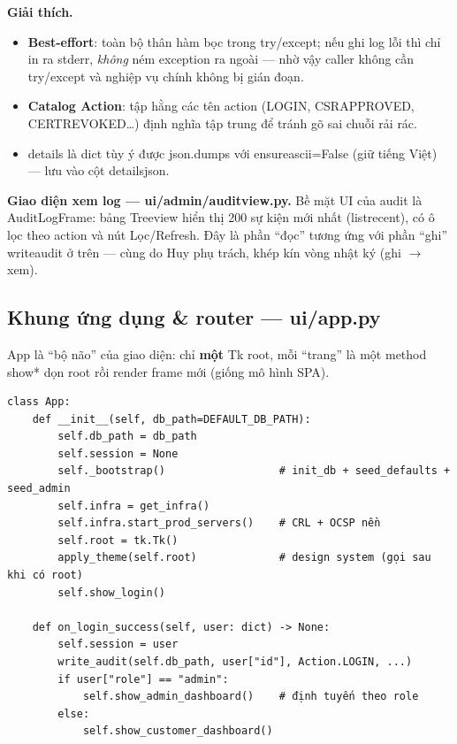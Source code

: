 \documentclass[12pt,a4paper]{article}
\newcommand{\code}[1]{{\ttfamily\small\def\_{\textunderscore\discretionary{}{}{}}#1}}
\begin{document}
\textbf{Giải thích.}
\begin{itemize}
  \item \textbf{Best-effort}: toàn bộ thân hàm bọc trong \code{try/except}; nếu
        ghi log lỗi thì chỉ in ra stderr, \emph{không} ném exception ra ngoài —
        nhờ vậy caller không cần \code{try/except} và nghiệp vụ chính không bị
        gián đoạn.
  \item \textbf{Catalog \code{Action}}: tập hằng các tên action
        (\code{LOGIN}, \code{CSR\_APPROVED}, \code{CERT\_REVOKED}\dots) định nghĩa
        tập trung để tránh gõ sai chuỗi rải rác.
  \item \code{details} là dict tùy ý được \code{json.dumps} với
        \code{ensure\_ascii=False} (giữ tiếng Việt) — lưu vào cột
        \code{details\_json}.
\end{itemize}

\textbf{Giao diện xem log --- \code{ui/admin/audit\_view.py}.} Bề mặt UI của audit
là \code{AuditLogFrame}: bảng Treeview hiển thị 200 sự kiện mới nhất
(\code{list\_recent}), có ô lọc theo \code{action} và nút Lọc/Refresh. Đây là
phần ``đọc'' tương ứng với phần ``ghi'' \code{write\_audit} ở trên — cùng do Huy
phụ trách, khép kín vòng nhật ký (ghi $\to$ xem).

\subsection{Khung ứng dụng \& router — \code{ui/app.py}}

\code{App} là ``bộ não'' của giao diện: chỉ \textbf{một} Tk root, mỗi ``trang'' là
một method \code{show\_*} dọn root rồi render frame mới (giống mô hình SPA).

\begin{Verbatim}
class App:
    def __init__(self, db_path=DEFAULT_DB_PATH):
        self.db_path = db_path
        self.session = None
        self._bootstrap()                  # init_db + seed_defaults + seed_admin
        self.infra = get_infra()
        self.infra.start_prod_servers()    # CRL + OCSP nền
        self.root = tk.Tk()
        apply_theme(self.root)             # design system (gọi sau khi có root)
        self.show_login()

    def on_login_success(self, user: dict) -> None:
        self.session = user
        write_audit(self.db_path, user["id"], Action.LOGIN, ...)
        if user["role"] == "admin":
            self.show_admin_dashboard()    # định tuyến theo role
        else:
            self.show_customer_dashboard()
\end{Verbatim}
\end{document}
